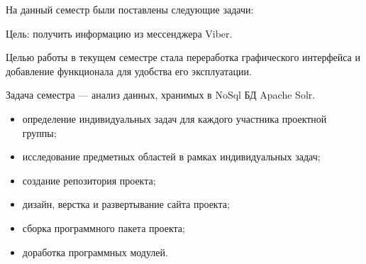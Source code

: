 На данный семестр были поставлены следующие задачи:

	Цель: получить информацию из мессенджера Viber.
	
	Целью работы в текущем семестре стала переработка графического интерфейса и добавление функционала для удобства его эксплуатации.
	
	Задача семестра --- анализ данных, хранимых в NoSql БД Apache Solr.

\begin{itemize}
  \item определение индивидуальных задач для каждого участника проектной группы;
  \item исследование предметных областей в рамках индивидуальных задач; 
  \item создание репозитория проекта;
  \item дизайн, верстка и развертывание сайта проекта;
  \item сборка программного пакета проекта;   
  \item доработка программных модулей.
\end{itemize}
